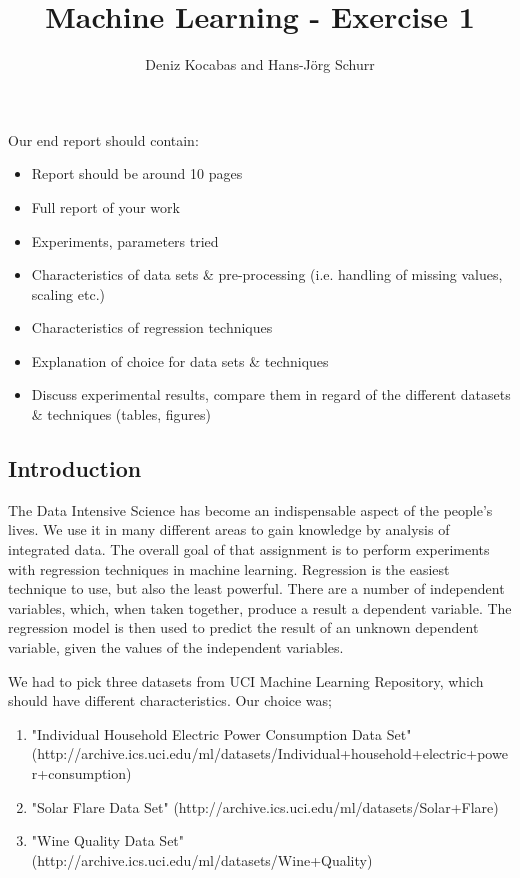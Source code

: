 \documentclass[a4paper]{article}
\begin{document}
\title{Machine Learning - Exercise 1 }
\author{Deniz Kocabas and Hans-Jörg Schurr}

\maketitle
\tableofcontents
\newpage

Our end report should contain:

\begin{itemize}
	\item Report should be around 10 pages
	\item Full report of your work
	\item Experiments, parameters tried
	\item Characteristics of data sets \& pre-processing (i.e.
handling of missing values, scaling etc.)
	\item Characteristics of regression techniques
    \item Explanation of choice for data sets \& techniques
	\item Discuss experimental results, compare them in regard of
the different datasets \& techniques (tables, figures)
\end{itemize}

\subsection{Introduction}
The Data Intensive Science has become an indispensable aspect of the people's lives. We use it in many different areas to gain knowledge by analysis of integrated data. The overall goal of that assignment is to perform experiments with regression techniques in machine learning. Regression is the easiest technique to use, but also the least powerful. There are a number of independent variables, which, when taken together, produce a result a dependent variable. The regression model is then used to predict the result of an unknown dependent variable, given the values of the independent variables. 

We had to pick three datasets from UCI Machine Learning Repository, which should have different characteristics. 
Our choice was;
\begin{enumerate}
    \item "Individual Household Electric Power Consumption Data Set" (http://archive.ics.uci.edu/ml/datasets/Individual+household+electric+power+consumption)
    \item "Solar Flare Data Set"
        (http://archive.ics.uci.edu/ml/datasets/Solar+Flare)
    \item "Wine Quality Data Set"
        (http://archive.ics.uci.edu/ml/datasets/Wine+Quality)
\end{enumerate}
\end{document}
